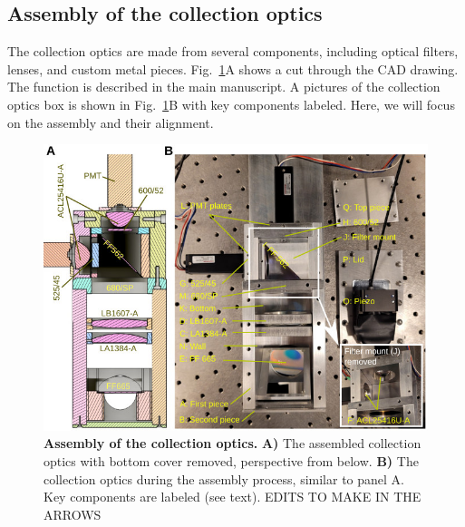 \documentclass[10pt,letterpaper]{article}
\begin{document}
\subsection{Assembly of the collection optics}
%
The collection optics are made from several components, including optical filters, lenses, and custom metal pieces. Fig.~\ref{sfig9}A shows a cut through the CAD drawing. The function is described in the main manuscript. A pictures of the collection optics box is shown in Fig.~\ref{sfig9}B with key components labeled. Here, we will focus on the assembly and their alignment.
%
\begin{figure}[h]
    \includegraphics[width=\textwidth]{sfig9.jpg}
    \caption{{\bf Assembly of the collection optics.} \textbf{A)} The assembled collection optics with bottom cover removed, perspective from below. \textbf{B)} The collection optics during the assembly process, similar to panel A. Key components are labeled (see text). EDITS TO MAKE IN THE ARROWS}
    \label{sfig9}
\end{figure}
%
\end{document}
